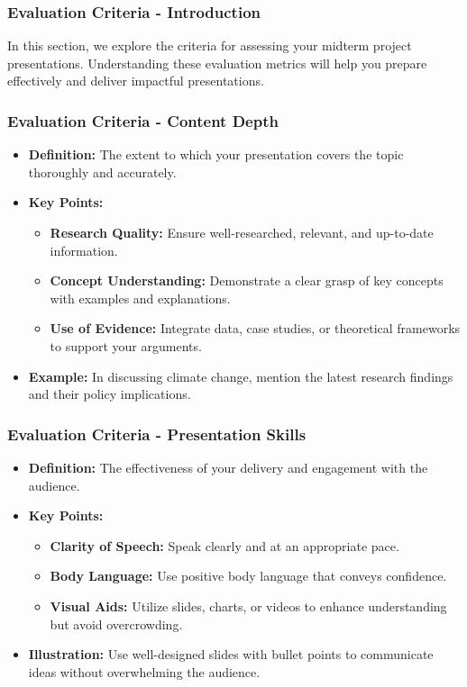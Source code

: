 \documentclass[aspectratio=169]{beamer}
\begin{document}
\begin{frame}[fragile]
    \frametitle{Evaluation Criteria - Introduction}
    In this section, we explore the criteria for assessing your midterm project presentations. 
    Understanding these evaluation metrics will help you prepare effectively and deliver impactful presentations.
\end{frame}

\begin{frame}[fragile]
    \frametitle{Evaluation Criteria - Content Depth}
    \begin{itemize}
        \item \textbf{Definition:} The extent to which your presentation covers the topic thoroughly and accurately.
        \item \textbf{Key Points:}
        \begin{itemize}
            \item \textbf{Research Quality:} Ensure well-researched, relevant, and up-to-date information.
            \item \textbf{Concept Understanding:} Demonstrate a clear grasp of key concepts with examples and explanations.
            \item \textbf{Use of Evidence:} Integrate data, case studies, or theoretical frameworks to support your arguments.
        \end{itemize}
        \item \textbf{Example:} In discussing climate change, mention the latest research findings and their policy implications.
    \end{itemize}
\end{frame}

\begin{frame}[fragile]
    \frametitle{Evaluation Criteria - Presentation Skills}
    \begin{itemize}
        \item \textbf{Definition:} The effectiveness of your delivery and engagement with the audience.
        \item \textbf{Key Points:}
        \begin{itemize}
            \item \textbf{Clarity of Speech:} Speak clearly and at an appropriate pace.
            \item \textbf{Body Language:} Use positive body language that conveys confidence.
            \item \textbf{Visual Aids:} Utilize slides, charts, or videos to enhance understanding but avoid overcrowding.
        \end{itemize}
        \item \textbf{Illustration:} Use well-designed slides with bullet points to communicate ideas without overwhelming the audience.
    \end{itemize}
\end{frame}
\end{document}
